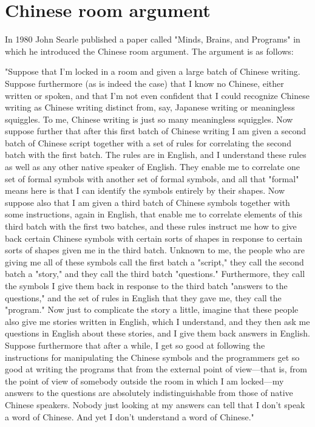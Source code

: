 \documentclass[12pt]{extarticle}
\begin{document}
\section{Chinese room argument}
In 1980 John Searle published a paper called "Minds, Brains, and Programs" in which he introduced the Chinese room argument.
The argument is as follows:
\begin{center}
    "Suppose that I'm locked in a room and given a large batch of Chinese writing. Suppose furthermore (as is indeed the case) that I know no Chinese, either written or spoken, and that I'm not even confident that I could recognize Chinese writing as Chinese writing distinct from, say, Japanese writing or meaningless squiggles. To me, Chinese writing is just so many meaningless squiggles. Now suppose further that after this first batch of Chinese writing I am given a second batch of Chinese script together with a set of rules for correlating the second batch with the first batch. The rules are in English, and I understand these rules as well as any other native speaker of English. They enable me to correlate one set of formal symbols with another set of formal symbols, and all that "formal" means here is that I can identify the symbols entirely by their shapes. Now suppose also that I am given a third batch of Chinese symbols together with some instructions, again in English, that enable me to correlate elements of this third batch with the first two batches, and these rules instruct me how to give back certain Chinese symbols with certain sorts of shapes in response to certain sorts of shapes given me in the third batch. Unknown to me, the people who are giving me all of these symbols call the first batch a "script," they call the second batch a "story," and they call the third batch "questions." Furthermore, they call the symbols I give them back in response to the third batch "answers to the questions," and the set of rules in English that they gave me, they call the "program." Now just to complicate the story a little, imagine that these people also give me stories written in English, which I understand, and they then ask me questions in English about these stories, and I give them back answers in English. Suppose furthermore that after a while, I get so good at following the instructions for manipulating the Chinese symbols and the programmers get so good at writing the programs that from the external point of view—that is, from the point of view of somebody outside the room in which I am locked—my answers to the questions are absolutely indistinguishable from those of native Chinese speakers. Nobody just looking at my answers can tell that I don't speak a word of Chinese. And yet I don't understand a word of Chinese."
\end{center}
\end{document}
